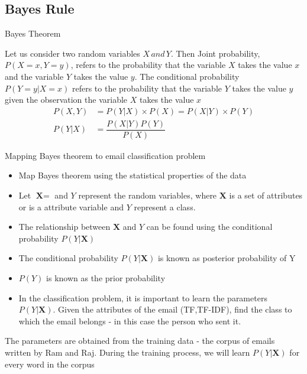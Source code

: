 \subsection{Bayes Rule}

\begin{frame}{Bayes Theorem}

Let us consider two random variables $X \, and \, Y$. Then
\vspace{0.3mm} Joint probability, $P(X=x,Y=y)$, refers to the probability that the variable $X$ takes the value $x$ and the variable $Y$ takes the value $y$.
\vspace{0.3mm}
The conditional probability $P(Y=y|X=x)$ refers to the probability that the variable $Y$ takes the value $y$ given the observation the variable $X$ takes the value $x$
\begin{align}
P(X,Y) &= P(Y|X)\times P(X) = P(X|Y)\times P(Y)\\
P(Y|X) &= \dfrac{P(X|Y)P(Y)}{P(X)}
\end{align}
\end{frame}

\begin{frame}{Mapping Bayes theorem to email classification problem}
\begin{itemize}
\item Map Bayes theorem using the statistical properties of the data
\item Let $\textbf{X} = $ and $Y$ represent the random variables, where $\textbf{X}$ is a set of attributes or is a attribute variable and $Y$ represent a class.
\item The relationship between $\textbf{X}$ and $Y$ can be found using the conditional probability  $P(Y|\textbf{X})$
\item The conditional probability $P(Y|\textbf{X})$ is known as posterior probability of Y
\item $P(Y)$ is known as the prior probability
\item In the classification problem, it is important to learn the parameters $P(Y|\textbf{X})$. Given the attributes of the email (TF,TF-IDF), find the class to which the email belongs - in this case the person who sent it.
\end{itemize}

\vspace{0.5 ex}
The parameters are obtained from the training data - the corpus of emails written by Ram and Raj. During the training process, we will learn $P(Y|\textbf{X})$ for every word in the corpus
\end{frame}


